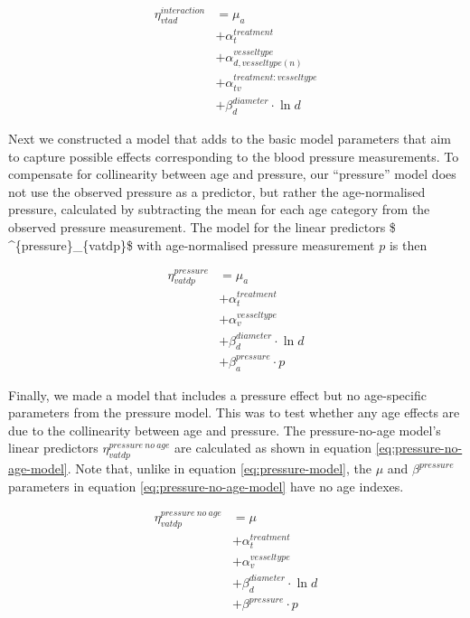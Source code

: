 \documentclass[
  letterpaper,
  DIV=11,
  numbers=noendperiod,
  oneside]{scrartcl}
\theoremstyle{plain}
\theoremstyle{remark}
\begin{document}
\begin{align}
        \label{eq:interaction}
    \eta^{interaction}_{vtad} &= \mu_{a} \\
      &+ \alpha^{treatment}_{t} \nonumber  \\
      &+ \alpha^{vesseltype}_{d,vesseltype(n)} \\
      &+ \alpha^{treatment:vesseltype}_{tv} \nonumber \\
    &+ \beta^{diameter}_{d} \cdot \ln{d} \nonumber
\end{align}

Next we constructed a model that adds to the basic model parameters that
aim to capture possible effects corresponding to the blood pressure
measurements. To compensate for collinearity between age and pressure,
our ``pressure'' model does not use the observed pressure as a
predictor, but rather the age-normalised pressure, calculated by
subtracting the mean for each age category from the observed pressure
measurement. The model for the linear predictors \$
\eta\^{}\{pressure\}\_\{vatdp\}\$ with age-normalised pressure
measurement \(p\) is then

\begin{align}
        \label{eq:pressure-model}
    \eta^{pressure}_{vatdp} &= \mu_{a} \\
      &+ \alpha^{treatment}_{t} \nonumber \\
      &+ \alpha^{vesseltype}_{v} \nonumber \\
      &+ \beta^{diameter}_{d} \cdot \ln{d} \nonumber \\
      &+ \beta^{pressure}_{a} \cdot p \nonumber
\end{align}

Finally, we made a model that includes a pressure effect but no
age-specific parameters from the pressure model. This was to test
whether any age effects are due to the collinearity between age and
pressure. The pressure-no-age model's linear predictors
\(\eta^{pressure\ no\ age}_{vatdp}\) are calculated as shown in equation
\eqref{eq:pressure-no-age-model}. Note that, unlike in equation
\eqref{eq:pressure-model}, the \(\mu\) and \(\beta^{pressure}\)
parameters in equation \eqref{eq:pressure-no-age-model} have no age
indexes.

\begin{align}
        \label{eq:pressure-no-age-model}
    \eta^{pressure\ no\ age}_{vatdp} &= \mu \\
      &+ \alpha^{treatment}_{t} \nonumber \\
      &+ \alpha^{vesseltype}_{v} \nonumber  \\
      &+ \beta^{diameter}_{d} \cdot \ln{d} \nonumber \\
      &+ \beta^{pressure} \cdot p \nonumber
\end{align}
\end{document}
